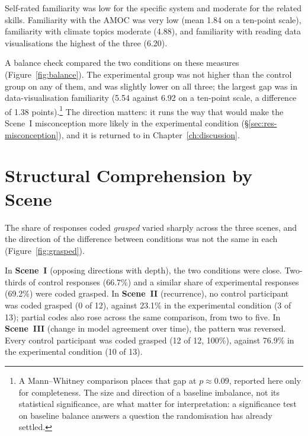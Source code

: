 Self-rated familiarity was low for the specific system and moderate for the related skills. Familiarity with the AMOC was very low (mean 1.84 on a ten-point scale), familiarity with climate topics moderate (4.88), and familiarity with reading data visualisations the highest of the three (6.20).

A balance check compared the two conditions on these measures (Figure~\ref{fig:balance}). The experimental group was not higher than the control group on any of them, and was slightly lower on all three; the largest gap was in data-visualisation familiarity (5.54 against 6.92 on a ten-point scale, a difference of 1.38 points).\footnote{A Mann--Whitney comparison places that gap at $p \approx 0.09$, reported here only for completeness. The size and direction of a baseline imbalance, not its statistical significance, are what matter for interpretation: a significance test on baseline balance answers a question the randomisation has already settled.} The direction matters: it runs the way that would make the Scene~I misconception more likely in the experimental condition (\S\ref{sec:res-misconception}), and it is returned to in Chapter~\ref{ch:discussion}.


\section{Structural Comprehension by Scene}
\label{sec:res-structure}

The share of responses coded \emph{grasped} varied sharply across the three scenes, and the direction of the difference between conditions was not the same in each (Figure~\ref{fig:grasped}).

In \textbf{Scene~I} (opposing directions with depth), the two conditions were close. Two-thirds of control responses (66.7\%) and a similar share of experimental responses (69.2\%) were coded grasped. In \textbf{Scene~II} (recurrence), no control participant was coded grasped (0 of 12), against 23.1\% in the experimental condition (3 of 13); partial codes also rose across the same comparison, from two to five. In \textbf{Scene~III} (change in model agreement over time), the pattern was reversed. Every control participant was coded grasped (12 of 12, 100\%), against 76.9\% in the experimental condition (10 of 13).

